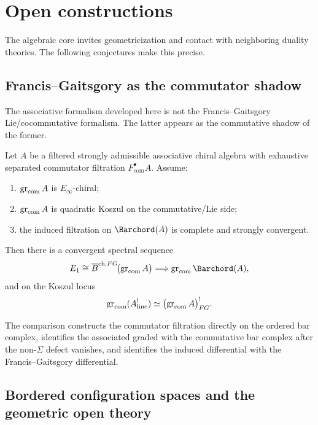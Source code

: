 \section{Open constructions}
\label{sec:conjectures}

The algebraic core invites geometricization and contact with
neighboring duality theories. The following conjectures make this precise.

\subsection{Francis--Gaitsgory as the commutator shadow}

The associative formalism developed here is not the Francis--Gaitsgory Lie/cocommutative
formalism. The latter appears as the commutative shadow of the former.

\begin{theorem}
\ClaimStatusProvedElsewhere
\label{thm:FG-shadow-vol2}
Let $A$ be a filtered strongly admissible associative chiral algebra with exhaustive separated
commutator filtration $F_{\mathrm{com}}^\bullet A$. Assume:
\begin{enumerate}[label=(\alph*)]
\item $\operatorname{gr}_{\mathrm{com}}A$ is $E_\infty$-chiral;
\item $\operatorname{gr}_{\mathrm{com}}A$ is quadratic Koszul on the commutative/Lie side;
\item the induced filtration on $\Barchord(A)$ is complete and strongly convergent.
\end{enumerate}
Then there is a convergent spectral sequence
\[
E_1\cong \overline{B}^{\mathrm{ch},FG}\!\bigl(\gr_{\mathrm{com}}A\bigr)
\Longrightarrow
\gr_{\mathrm{com}}\Barchord(A),
\]
and on the Koszul locus
\[
\operatorname{gr}_{\mathrm{com}}(A^!_{\mathrm{line}})
\simeq \bigl(\operatorname{gr}_{\mathrm{com}}A\bigr)^!_{FG}.
\]
\end{theorem}

\begin{remark}
The comparison constructs the commutator filtration directly on the ordered bar complex, identifies
the associated graded with the commutative bar complex after the non-$\Sigma$ defect vanishes, and
identifies the induced differential with the Francis--Gaitsgory differential.
\end{remark}

\subsection{Bordered configuration spaces and the geometric open theory}

